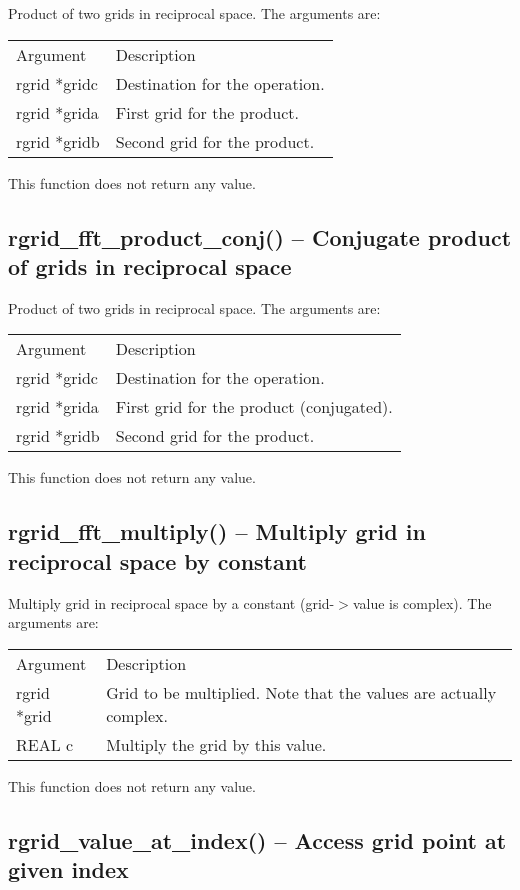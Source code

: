 \documentclass[12pt,letterpaper]{report}
\begin{document}
Product of two grids in reciprocal space. The arguments are:
\begin{longtable}{p{} p{}}
Argument & Description\\
\cline{1-2}
rgrid *gridc & Destination for the operation.\\
rgrid *grida & First grid for the product.\\
rgrid *gridb & Second grid for the product.\\
\end{longtable}
\noindent
This function does not return any value.

\subsection{rgrid\_fft\_product\_conj() -- Conjugate product of grids in reciprocal space}

Product of two grids in reciprocal space. The arguments are:
\begin{longtable}{p{} p{}}
Argument & Description\\
\cline{1-2}
rgrid *gridc & Destination for the operation.\\
rgrid *grida & First grid for the product (conjugated).\\
rgrid *gridb & Second grid for the product.\\
\end{longtable}
\noindent
This function does not return any value.

\subsection{rgrid\_fft\_multiply() -- Multiply grid in reciprocal space by constant}

Multiply grid in reciprocal space by a constant (grid-$>$value is complex). The arguments are:
\begin{longtable}{p{} p{}}
Argument & Description\\
\cline{1-2}
rgrid *grid & Grid to be multiplied. Note that the values are actually complex.\\
REAL c & Multiply the grid by this value.\\
\end{longtable}
\noindent
This function does not return any value.

\subsection{rgrid\_value\_at\_index() -- Access grid point at given index}
\end{document}
